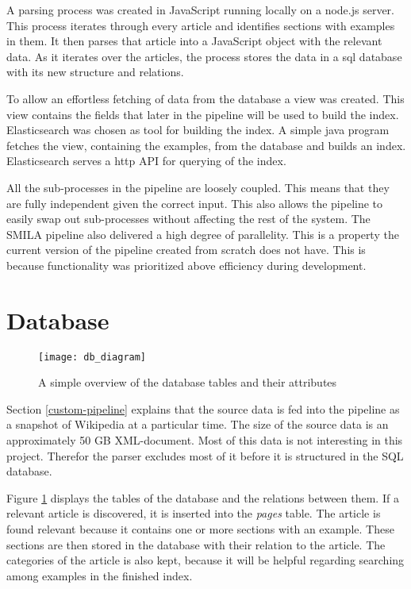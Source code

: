 A parsing process was created in JavaScript running locally on a node.js server. This process iterates through every article and identifies sections with examples in them. It then parses that article into a JavaScript object with the relevant data. As it iterates over the articles, the process stores the data in a sql database with its new structure and relations. 

To allow an effortless fetching of data from the database a view was created. This view contains the fields that later in the pipeline will be used to build the index. Elasticsearch was chosen as tool for building the index. A simple java program fetches the view, containing the examples, from the database and builds an index. Elasticsearch serves a http API for querying of the index.

All the sub-processes in the pipeline are loosely coupled. This means that they are fully independent given the correct input. This also allows the pipeline to easily swap out sub-processes without affecting the rest of the system. The SMILA pipeline also delivered a high degree of parallelity. This is a property the current version of the pipeline created from scratch does not have. This is because functionality was prioritized above efficiency during development. 



\section{Database}

\begin{figure}[h] 
\caption{A simple overview of the database tables and their attributes}
\texttt{[image: db\_diagram]}
\label{fig:db_diagram}
\end{figure}

Section \ref{custom-pipeline} explains that the source data is fed into the pipeline as a snapshot of Wikipedia at a particular time. The size of the source data is an approximately 50 GB XML-document. Most of this data is not interesting in this project. Therefor the parser excludes most of it before it is structured in the SQL database. 

Figure \ref{fig:db_diagram} displays the tables of the database and the relations between them. If a relevant article is discovered, it is inserted into the \textit{pages} table. The article is found relevant because it contains one or more sections with an example. These sections are then stored in the database with their relation to the article. The categories of the article is also kept, because it will be helpful regarding searching among examples in the finished index.  

